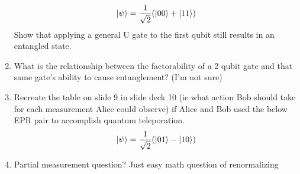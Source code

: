 \documentclass[12pt]{article}
\begin{document}
\begin{enumerate}[font=\bfseries]
    \[\ket{\psi} = \frac{1}{\sqrt{2}}(\ket{00}+\ket{11})\]
    Show that applying a general U gate to the first qubit still results in an entangled state.
    \item What is the relationship between the factorability of a 2 qubit gate and that same gate's ability to cause entanglement? (I'm not sure)
    \item Recreate the table on slide 9 in slide deck 10 (ie what action Bob should take for each measurement Alice could observe) if Alice and Bob used the below EPR pair to accomplish quantum teleporation.
    \[\ket{\psi} = \frac{1}{\sqrt{2}}(\ket{01}-\ket{10})\]
    \item Partial measurement question? Just easy math question of renormalizing
    
\end{enumerate}
\end{document}

